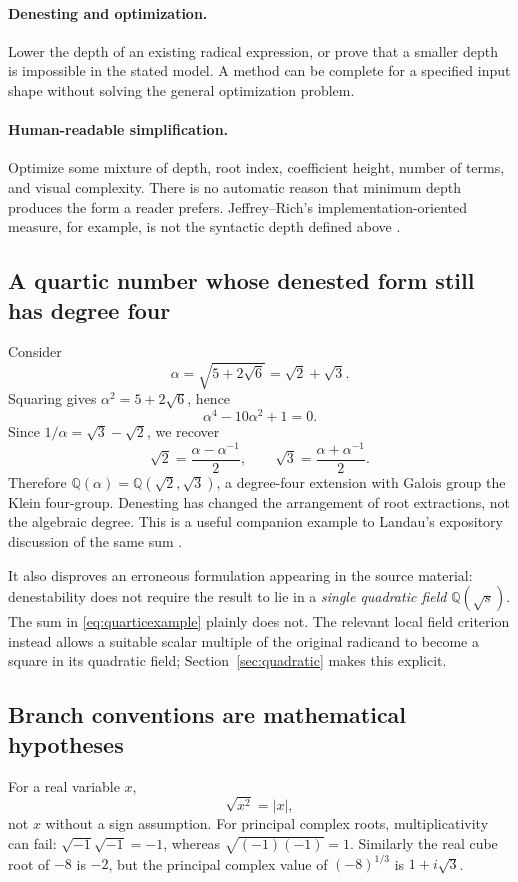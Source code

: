 \documentclass[11pt,letterpaper]{article}
\numberwithin{equation}{section}
\theoremstyle{definition}
\theoremstyle{remark}
\newcommand{\Q}{\mathbb{Q}}
\begin{document}
\paragraph{Denesting and optimization.} Lower the depth of an existing radical expression, or prove that a smaller depth is impossible in the stated model. A method can be complete for a specified input shape without solving the general optimization problem.

\paragraph{Human-readable simplification.} Optimize some mixture of depth, root index, coefficient height, number of terms, and visual complexity. There is no automatic reason that minimum depth produces the form a reader prefers. Jeffrey--Rich's implementation-oriented measure, for example, is not the syntactic depth defined above \cite{jeffrey}.

\subsection{A quartic number whose denested form still has degree four}
Consider
\begin{equation}\label{eq:quarticexample}
\alpha=\sqrt{5+2\sqrt6}=\sqrt2+\sqrt3.
\end{equation}
Squaring gives $\alpha^2=5+2\sqrt6$, hence
\[
\alpha^4-10\alpha^2+1=0.
\]
Since $1/\alpha=\sqrt3-\sqrt2$, we recover
\[
\sqrt2=\frac{\alpha-\alpha^{-1}}2,
\qquad \sqrt3=\frac{\alpha+\alpha^{-1}}2.
\]
Therefore $\Q(\alpha)=\Q(\sqrt2,\sqrt3)$, a degree-four extension with Galois group the Klein four-group. Denesting has changed the arrangement of root extractions, not the algebraic degree. This is a useful companion example to Landau's expository discussion of the same sum \cite{landauviews}.

It also disproves an erroneous formulation appearing in the source material: denestability does not require the result to lie in a \emph{single quadratic field} $\Q(\sqrt s)$. The sum in \eqref{eq:quarticexample} plainly does not. The relevant local field criterion instead allows a suitable scalar multiple of the original radicand to become a square in its quadratic field; Section~\ref{sec:quadratic} makes this explicit.

\subsection{Branch conventions are mathematical hypotheses}
For a real variable $x$,
\[
\sqrt{x^2}=|x|,
\]
not $x$ without a sign assumption. For principal complex roots, multiplicativity can fail: $\sqrt{-1}\sqrt{-1}=-1$, whereas $\sqrt{(-1)(-1)}=1$. Similarly the real cube root of $-8$ is $-2$, but the principal complex value of $(-8)^{1/3}$ is $1+i\sqrt3$.
\end{document}

